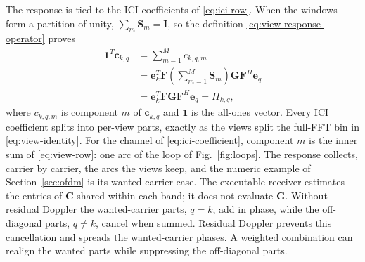 \documentclass[conference]{IEEEtran}
\begin{document}
The response is tied to the ICI coefficients of \eqref{eq:ici-row}.  When
the windows form a partition of unity, \(\sum_m\mathbf S_m=\mathbf I\), so
the definition \eqref{eq:view-response-operator} proves
\begin{equation}
  \begin{aligned}
    \mathbf 1^{T}\mathbf c_{k,q}
    &=
    \sum_{m=1}^{M}c_{k,q,m}\\
    &=
    \mathbf e_k^T\mathbf F
    \left(\sum_{m=1}^{M}\mathbf S_m\right)
    \mathbf G\mathbf F^H\mathbf e_q\\
    &=
    \mathbf e_k^T\mathbf F\mathbf G\mathbf F^H\mathbf e_q
    =
    H_{k,q},
  \end{aligned}
  \label{eq:gain-decomposition}
\end{equation}
where \(c_{k,q,m}\) is component \(m\) of \(\mathbf c_{k,q}\) and
\(\mathbf 1\) is the all-ones vector.  Every ICI coefficient splits into
per-view parts, exactly as the views split the full-FFT bin in
\eqref{eq:view-identity}.  For the channel of \eqref{eq:ici-coefficient},
component \(m\) is the inner sum of \eqref{eq:view-row}: one arc of
the loop of Fig.~\ref{fig:loops}.  The response collects, carrier by
carrier, the arcs the views keep, and the numeric example of
Section~\ref{sec:ofdm} is its wanted-carrier case.  The executable receiver
estimates the entries of \(\mathbf C\) shared within each band; it does not evaluate
\(\mathbf G\).  Without residual Doppler the wanted-carrier parts,
\(q=k\), add in phase, while the off-diagonal parts, \(q\neq k\), cancel
when summed.  Residual Doppler prevents this cancellation and spreads the
wanted-carrier phases.  A weighted combination can realign the wanted parts
while suppressing the off-diagonal parts.
\end{document}
